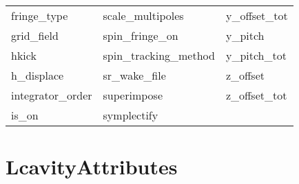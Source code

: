 \begin{tabular}{lll}
fringe_type                 & scale_multipoles            & y_offset_tot                \\
grid_field                  & spin_fringe_on              & y_pitch                     \\
hkick                       & spin_tracking_method        & y_pitch_tot                 \\
h_displace                  & sr_wake_file                & z_offset                    \\
integrator_order            & superimpose                 & z_offset_tot                \\
is_on                       & symplectify                 &                             \\
 \bottomrule
 \end{tabular}
 \vfill
 
 \section{LcavityAttributes}
 \label{s:list.lcavity}
 

